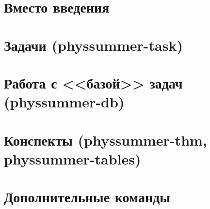 

\teachermode




\section*{Вместо введения}










\section{Задачи (physsummer-task)}



\section{Работа с <<базой>> задач (physsummer-db)}



\section{Конспекты (physsummer-thm, physsummer-tables)}







\section{Дополнительные команды}





